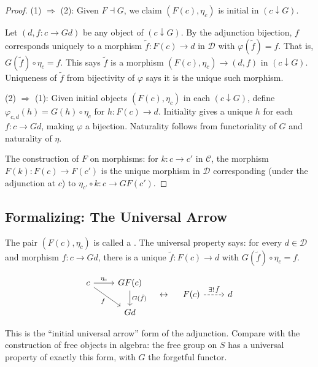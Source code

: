\begin{proof}
(1) $\Rightarrow$ (2): Given $F \dashv G$, we claim $(F(c), \eta_c)$ is initial
in $(c \downarrow G)$.

Let $(d, f : c \to Gd)$ be any object of $(c \downarrow G)$. By the adjunction
bijection, $f$ corresponds uniquely to a morphism $\tilde{f} : F(c) \to d$ in
$\mathcal{D}$ with $\varphi(\tilde{f}) = f$. That is, $G(\tilde{f}) \circ
\eta_c = f$. This says $\tilde{f}$ is a morphism $(F(c), \eta_c) \to (d, f)$
in $(c \downarrow G)$. Uniqueness of $\tilde{f}$ from bijectivity of $\varphi$
says it is the unique such morphism.

(2) $\Rightarrow$ (1): Given initial objects $(F(c), \eta_c)$ in each $(c
\downarrow G)$, define $\varphi_{c,d}(h) = G(h) \circ \eta_c$ for $h : F(c)
\to d$. Initiality gives a unique $h$ for each $f : c \to Gd$, making $\varphi$
a bijection. Naturality follows from functoriality of $G$ and naturality of $\eta$.

The construction of $F$ on morphisms: for $k : c \to c'$ in $\mathcal{C}$, the
morphism $F(k) : F(c) \to F(c')$ is the unique morphism in $\mathcal{D}$
corresponding (under the adjunction at $c$) to $\eta_{c'} \circ k : c \to GF(c')$.
\end{proof}

\subsection{Formalizing: The Universal Arrow}

The pair $(F(c), \eta_c)$ is called a .
The universal property says: for every $d \in \mathcal{D}$ and morphism $f :
c \to Gd$, there is a unique $\tilde{f} : F(c) \to d$ with $G(\tilde{f}) \circ
\eta_c = f$.

\begin{equation*}
\begin{tikzcd}
  c \arrow[r, "\eta_c"] \arrow[dr, "f"'] & GF(c) \arrow[d, "G(\tilde{f})"] \\
  & Gd
\end{tikzcd}
\quad \leftrightarrow \quad
\begin{tikzcd}
  F(c) \arrow[r, dashed, "\exists!\, \tilde{f}"] & d
\end{tikzcd}
\end{equation*}

This is the ``initial universal arrow'' form of the adjunction. Compare with
the construction of free objects in algebra: the free group on $S$ has a
universal property of exactly this form, with $G$ the forgetful functor.

